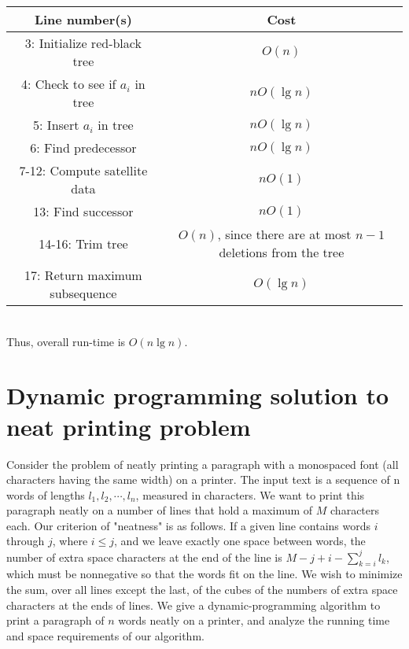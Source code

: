 \documentclass[paper=a4, fontsize=11pt]{scrartcl} %
\numberwithin{equation}{section} %
\numberwithin{figure}{section} %
\numberwithin{table}{section} %
\begin{document}
\begin{tabular}{| c | c |}
\hline
\textbf{Line number(s)} & Cost \\
\hline
3: Initialize red-black tree & $O(n)$ \\
\hline
4: Check to see if $a_i$ in tree & $ n O(\lg n)$ \\
\hline
5: Insert $a_i$ in tree & $ n O(\lg n)$ \\
\hline
6: Find predecessor & $n O(\lg n)$ \\
\hline
7-12: Compute satellite data & $n O(1)$ \\
\hline
13: Find successor & $n O(1)$ \\
\hline
14-16: Trim tree & $O(n)$, since there are at most $n-1$ deletions from the tree \\
\hline
17: Return maximum subsequence & $O(\lg n)$\\
\hline
\end{tabular} \\

Thus, overall run-time is $O(n \lg n)$.

\section{Dynamic programming solution to neat printing problem}

Consider the problem of neatly printing a paragraph with a monospaced font (all characters having the same width) on a printer. The input text is a sequence of n words of lengths $l_1, l_2, \cdots, l_n$, measured in characters. We want to print this paragraph neatly on a number of lines that hold a maximum of $M$ characters each. Our criterion of "neatness" is as follows. If a given line contains words $i$ through $j$, where $i \leq j$, and we leave exactly one space between words, the number of extra space characters at the end of the line is $M - j + i - \sum_{k = i}^j l_k$, which must be nonnegative so that the words fit on the line. We wish to minimize the sum, over all lines except the last, of the cubes of the numbers of extra space characters at the ends of lines. We give a dynamic-programming algorithm to print a paragraph of $n$ words neatly on a printer, and analyze the running time and space requirements of our algorithm. \\
\end{document}
